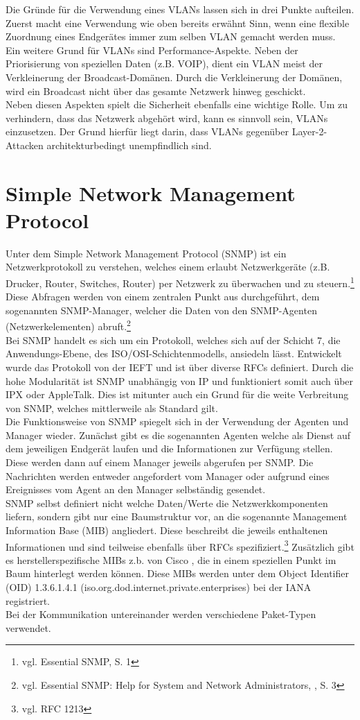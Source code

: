 Die Gründe für die Verwendung eines VLANs lassen sich in drei Punkte aufteilen.
Zuerst macht eine Verwendung wie oben bereits erwähnt Sinn, wenn eine flexible Zuordnung eines Endgerätes immer zum selben VLAN gemacht werden muss.\\
Ein weitere Grund für VLANs sind Performance-Aspekte. Neben der Priorisierung von speziellen Daten (z.B. VOIP), dient ein VLAN meist der Verkleinerung der Broadcast-Domänen.
Durch die Verkleinerung der Domänen, wird ein Broadcast nicht über das gesamte Netzwerk hinweg geschickt.\\
Neben diesen Aspekten spielt die Sicherheit ebenfalls eine wichtige Rolle.
Um zu verhindern, dass das Netzwerk abgehört wird, kann es sinnvoll sein, VLANs einzusetzen.
Der Grund hierfür liegt darin, dass VLANs gegenüber Layer-2-Attacken architekturbedingt unempfindlich sind.


\section{Simple Network Management Protocol}
\label{sec:snmp}
Unter dem Simple Network Management Protocol (SNMP) ist ein Netzwerkprotokoll zu verstehen, welches einem erlaubt Netzwerkgeräte (z.B. Drucker, Router, Switches, Router) per Netzwerk zu überwachen und zu steuern.\footnote{vgl. Essential SNMP, S. 1}
Diese Abfragen werden von einem zentralen Punkt aus durchgeführt, dem sogenannten SNMP-Manager, welcher die Daten von den SNMP-Agenten (Netzwerkelementen) abruft.\footnote{vgl. Essential SNMP: Help for System and Network Administrators, , S. 3}\\
Bei SNMP handelt es sich um ein Protokoll, welches sich auf der Schicht 7, die Anwendungs-Ebene, des ISO/OSI-Schichtenmodells, ansiedeln lässt.
Entwickelt wurde das Protokoll von der IEFT und ist über diverse RFCs definiert.
Durch die hohe Modularität ist SNMP unabhängig von IP und funktioniert somit auch über IPX oder AppleTalk. Dies ist mitunter auch ein Grund für die weite Verbreitung von SNMP, welches mittlerweile als Standard gilt.\\
Die Funktionsweise von  SNMP spiegelt sich in der Verwendung der Agenten und Manager wieder.
Zunächst gibt es die sogenannten Agenten welche als Dienst auf dem jeweiligen Endgerät laufen und die Informationen zur Verfügung stellen. Diese werden dann auf einem Manager jeweils abgerufen per SNMP. Die Nachrichten werden entweder angefordert vom Manager oder aufgrund eines Ereignisses vom Agent an den Manager selbständig gesendet.\\
SNMP selbst definiert nicht welche Daten/Werte die Netzwerkkomponenten liefern, sondern gibt nur eine Baumstruktur vor, an die sogenannte Management Information Base (MIB) angliedert.
Diese beschreibt die jeweils enthaltenen Informationen und sind teilweise ebenfalls über RFCs spezifiziert.\footnote{vgl. RFC 1213} Zusätzlich gibt es herstellerspezifische MIBs z.b. von Cisco , die in einem speziellen Punkt im Baum hinterlegt werden können. Diese MIBs werden unter dem  Object Identifier (OID) 1.3.6.1.4.1 (iso.org.dod.internet.private.enterprises) bei der IANA registriert.\\
Bei der Kommunikation untereinander werden verschiedene Paket-Typen verwendet.


